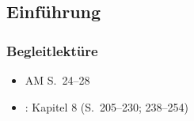






\subsection{Einführung}
\nocite{Altmann&Co07a} \nocite{Hall00a} \nocite{Pompino95a} \nocite{Ramers08a} \nocite{Repp&Co12a} \nocite{WieseR96a} \nocite{WieseR11a}

\begin{frame}
\frametitle{Begleitlektüre}
\begin{itemize}
	\item AM S.~24--28
	\item \citet{Hall00a}: Kapitel 8 (S.~205--230; 238--254)
\end{itemize}
\end{frame}


